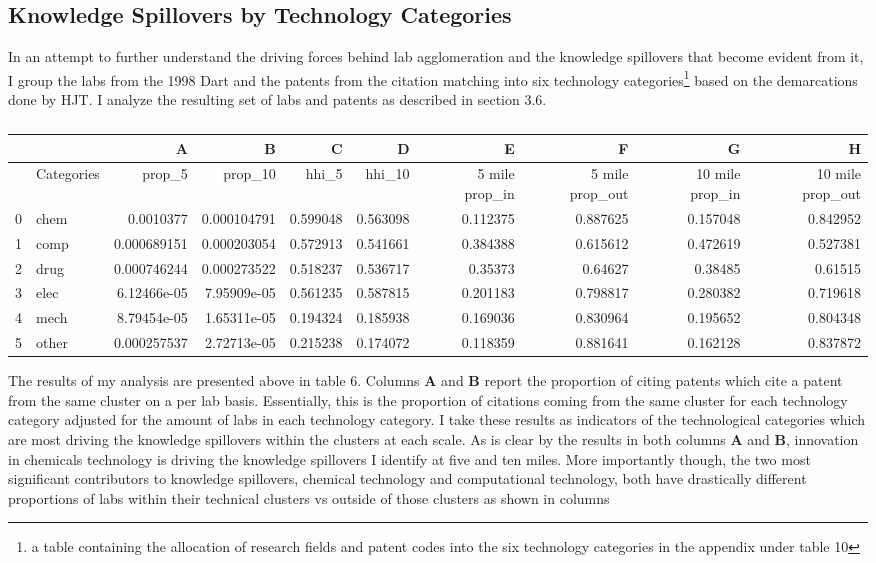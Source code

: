 \documentclass[12pt,letterpaper]{article}
\begin{document}
\subsection{Knowledge Spillovers by Technology Categories}
In an attempt to further understand the driving forces behind lab agglomeration and the knowledge spillovers that become evident from it, I group the labs from the 1998 Dart and the patents from the citation matching into six technology categories\footnote{a table containing the allocation of research fields and patent codes into the six technology categories in the appendix under table 10} based on the demarcations done by HJT. I analyze the resulting set of labs and patents as described in section 3.6.
\begin{table}[H]
\tiny
\centering
\begin{tabular}{rlrrrrrrrr}
\multicolumn{1}{l}{} &       & A           & B           & C        & D        & E        & F        & G        & H        \\ \hline
 & Categories & prop\_5 & prop\_10 & hhi\_5 & hhi\_10 & 5 mile prop\_in & 5 mile prop\_out & 10 mile prop\_in & 10 mile prop\_out \\ \hline
0                    & chem  & 0.0010377   & 0.000104791 & 0.599048 & 0.563098 & 0.112375 & 0.887625 & 0.157048 & 0.842952 \\
1                    & comp  & 0.000689151 & 0.000203054 & 0.572913 & 0.541661 & 0.384388 & 0.615612 & 0.472619 & 0.527381 \\
2                    & drug  & 0.000746244 & 0.000273522 & 0.518237 & 0.536717 & 0.35373  & 0.64627  & 0.38485  & 0.61515  \\
3                    & elec  & 6.12466e-05 & 7.95909e-05 & 0.561235 & 0.587815 & 0.201183 & 0.798817 & 0.280382 & 0.719618 \\
4                    & mech  & 8.79454e-05 & 1.65311e-05 & 0.194324 & 0.185938 & 0.169036 & 0.830964 & 0.195652 & 0.804348 \\
5                    & other & 0.000257537 & 2.72713e-05 & 0.215238 & 0.174072 & 0.118359 & 0.881641 & 0.162128 & 0.837872 \\ \hline
\end{tabular}
\caption{}
\label{tab:my-table}
\end{table}
The results of my analysis are presented above in table 6. Columns \textbf{A} and \textbf{B} report the proportion of citing patents which cite a patent from the same cluster on a per lab basis. Essentially, this is the proportion of citations coming from the same cluster for each technology category adjusted for the amount of labs in each technology category. I take these results as indicators of the technological categories which are most driving the knowledge spillovers within the clusters at each scale. As is clear by the results in both columns \textbf{A} and \textbf{B}, innovation in chemicals technology is driving the knowledge spillovers I identify at five and ten miles. More importantly though, the two most significant contributors to knowledge spillovers, chemical technology and computational technology, both have drastically different proportions of labs within their technical clusters vs outside of those clusters as shown in columns
\end{document}
